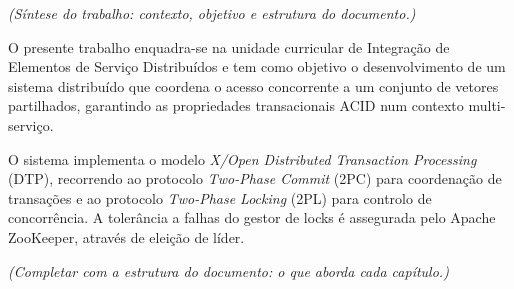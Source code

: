 
\textit{(Síntese do trabalho: contexto, objetivo e estrutura do documento.)}

O presente trabalho enquadra-se na unidade curricular de Integração de Elementos de Serviço
Distribuídos e tem como objetivo o desenvolvimento de um sistema distribuído que coordena
o acesso concorrente a um conjunto de vetores partilhados, garantindo as propriedades
transacionais ACID num contexto multi-serviço.

O sistema implementa o modelo \textit{X/Open Distributed Transaction Processing} (DTP),
recorrendo ao protocolo \textit{Two-Phase Commit} (2PC) para coordenação de transações
e ao protocolo \textit{Two-Phase Locking} (2PL) para controlo de concorrência.
A tolerância a falhas do gestor de locks é assegurada pelo Apache ZooKeeper,
através de eleição de líder.

\textit{(Completar com a estrutura do documento: o que aborda cada capítulo.)}
